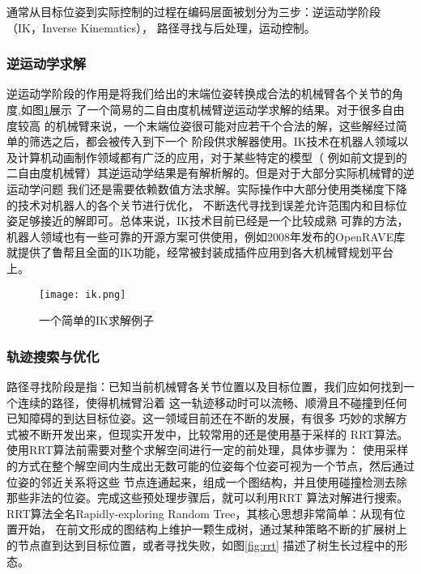 通常从目标位姿到实际控制的过程在编码层面被划分为三步：逆运动学阶段（IK，Inverse Kinematics），
路径寻找与后处理，运动控制。

\subsubsection{逆运动学求解}

逆运动学阶段的作用是将我们给出的末端位姿转换成合法的机械臂各个关节的角度,如图\ref{fig:ik}展示
了一个简易的二自由度机械臂逆运动学求解的结果。对于很多自由度较高
的机械臂来说，一个末端位姿很可能对应若干个合法的解，这些解经过简单的筛选之后，都会被传入到下一个
阶段供求解器使用。IK技术在机器人领域以及计算机动画制作领域都有广泛的应用，对于某些特定的模型（
例如前文提到的二自由度机械臂）其逆运动学结果是有解析解的。但是对于大部分实际机械臂的逆运动学问题
我们还是需要依赖数值方法求解。实际操作中大部分使用类梯度下降的技术对机器人的各个关节进行优化，
不断迭代寻找到误差允许范围内和目标位姿足够接近的解即可。总体来说，IK技术目前已经是一个比较成熟
可靠的方法，机器人领域也有一些可靠的开源方案可供使用，例如2008年发布的OpenRAVE库\cite{diankov2008openrave}
就提供了鲁帮且全面的IK功能，经常被封装成插件应用到各大机械臂规划平台上。

\begin{figure}[ht] %
  \centering
  \texttt{[image: ik.png]}
  \caption{一个简单的IK求解例子}
  \label{fig:ik}
\end{figure}

\subsubsection{轨迹搜索与优化}

路径寻找阶段是指：已知当前机械臂各关节位置以及目标位置，我们应如何找到一个连续的路径，使得机械臂沿着
这一轨迹移动时可以流畅、顺滑且不碰撞到任何已知障碍的到达目标位姿。这一领域目前还在不断的发展，有很多
巧妙的求解方式被不断开发出来\cite{masehian2007classic}，但现实开发中，比较常用的还是使用基于采样的
RRT\cite{lavalle1998rapidly}算法。使用RRT算法前需要对整个求解空间进行一定的前处理，具体步骤为：
使用采样的方式在整个解空间内生成出无数可能的位姿每个位姿可视为一个节点，然后通过位姿的邻近关系将这些
节点连通起来，组成一个图结构，并且使用碰撞检测去除那些非法的位姿。完成这些预处理步骤后，就可以利用RRT
算法对解进行搜索。RRT算法全名Rapidly-exploring Random Tree，其核心思想非常简单：从现有位置开始，
在前文形成的图结构上维护一颗生成树，通过某种策略不断的扩展树上的节点直到达到目标位置，或者寻找失败，如图\ref{fig:rrt}
描述了树生长过程中的形态。


